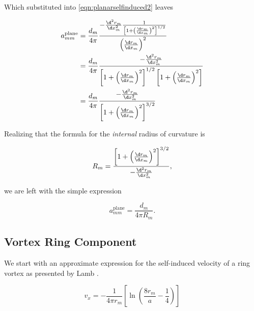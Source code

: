 \noindent Which substituted into \cref{eqn:planarselfinduced2} leaves

\begin{align}
a^\text{plane}_{mm} &= \frac{d_m}{4 \pi}
\frac{
    - \frac{\d^2 r_m}{\d x_m^2} \frac{1}{\left[1 + \left(\frac{\d r_m}{\d x_m}\right)^2\right]^{1/2} }
}{
    \left(\frac{\d r_m}{\d x_m}\right)^2
} \\
%
    &= \frac{d_m}{4 \pi}
    \frac{
        - \frac{\d^2 r_m}{\d x_m^2}
    }{
        \left[1 + \left(\frac{\d r_m}{\d x_m}\right)^2\right]^{1/2} \left[1 + \left(\frac{\d r_m}{\d x_m}\right)^2\right]
    } \\
%
    &= \frac{d_m}{4 \pi}
    \frac{
        - \frac{\d^2 r_m}{\d x_m^2}
    }{
        \left[1 + \left(\frac{\d r_m}{\d x_m}\right)^2\right]^{3/2}
    }
\end{align}

Realizing that the formula for the \textit{internal} radius of curvature is

\begin{equation}
    R_m = \frac{
        \left[1 + \left(\frac{\d r_m}{\d x_m}\right)^2\right]^{3/2}
    }{
        -\frac{\d^2 r_m}{\d x_m^2}
    },
\end{equation}

\noindent we are left with the simple expression

\begin{equation}
    a^\text{plane}_{mm} = \frac{d_m}{4 \pi R_m}.
\end{equation}



\subsection{Vortex Ring Component}
\label{app:smokeringinduction}

We start with an approximate expression for the self-induced velocity of a ring vortex as presented by Lamb \cite{Lamb_1945}.%

\begin{equation}
    \label{eqn:lambvortex}
    v_x = - \frac{1}{4 \pi r_m} \left[ \ln \left(\frac{8 r_m}{a} - \frac{1}{4}\right)\right]
\end{equation}

